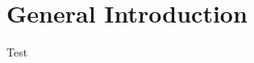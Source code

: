 \documentclass[introduction.tex]{subfiles}
\begin{document}
\section{General Introduction}

Test
\end{document}
